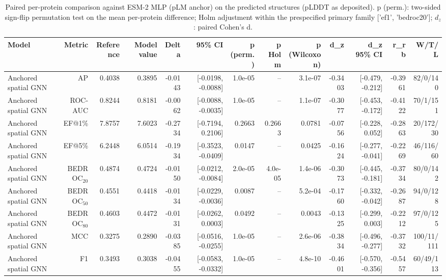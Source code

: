 \begin{table}[t]
\centering
\small
\caption{Paired per-protein comparison against ESM-2 MLP (pLM anchor) on the predicted structures (pLDDT as deposited). p (perm.): two-sided sign-flip permutation test on the mean per-protein difference; Holm adjustment within the prespecified primary family ['ef1', 'bedroc20']; $d_z$: paired Cohen's d.}
\label{tab:table_paired_vs_base_plm}
\begin{tabular}{lrrrrrrrrrrrr}
\toprule
Model & Metric & Reference & Model value & Delta & 95\% CI & p (perm.) & p Holm & p (Wilcoxon) & d\_z & d\_z 95\% CI & r\_rb & W/T/L \\
\midrule
Anchored spatial GNN & AP & 0.4038 & 0.3895 & -0.0143 & [-0.0198, -0.0088] & 1.0e-05 & -- & 3.1e-07 & -0.3403 & [-0.479, -0.212] & -0.3961 & 82/0/140 \\
Anchored spatial GNN & ROC-AUC & 0.8244 & 0.8181 & -0.0062 & [-0.0088, -0.0035] & 1.0e-05 & -- & 1.1e-07 & -0.3077 & [-0.453, -0.172] & -0.4122 & 70/1/151 \\
Anchored spatial GNN & EF@1\% & 7.8757 & 7.6023 & -0.2734 & [-0.7194, 0.2106] & 0.2663 & 0.2663 & 0.0781 & -0.0756 & [-0.228, 0.052] & -0.2863 & 20/172/30 \\
Anchored spatial GNN & EF@5\% & 6.2448 & 6.0514 & -0.1934 & [-0.3523, -0.0409] & 0.0147 & -- & 0.0425 & -0.1624 & [-0.277, -0.041] & -0.2269 & 46/116/60 \\
Anchored spatial GNN & BEDROC$_{20}$ & 0.4874 & 0.4724 & -0.0150 & [-0.0212, -0.0084] & 2.0e-05 & 4.0e-05 & 1.4e-06 & -0.3073 & [-0.445, -0.181] & -0.3734 & 80/0/142 \\
Anchored spatial GNN & BEDROC$_{50}$ & 0.4551 & 0.4418 & -0.0134 & [-0.0229, -0.0036] & 0.0087 & -- & 5.2e-04 & -0.1760 & [-0.332, -0.042] & -0.2687 & 94/0/128 \\
Anchored spatial GNN & BEDROC$_{80}$ & 0.4603 & 0.4472 & -0.0131 & [-0.0262, 0.0003] & 0.0492 & -- & 0.0043 & -0.1325 & [-0.299, 0.003] & -0.2212 & 97/0/125 \\
Anchored spatial GNN & MCC & 0.3275 & 0.2890 & -0.0385 & [-0.0516, -0.0255] & 1.0e-05 & -- & 2.6e-06 & -0.3834 & [-0.496, -0.277] & -0.3732 & 100/11/111 \\
Anchored spatial GNN & F1 & 0.3493 & 0.3038 & -0.0455 & [-0.0583, -0.0332] & 1.0e-05 & -- & 4.8e-10 & -0.4601 & [-0.570, -0.356] & -0.5457 & 60/49/113 \\
\bottomrule
\end{tabular}
\end{table}
